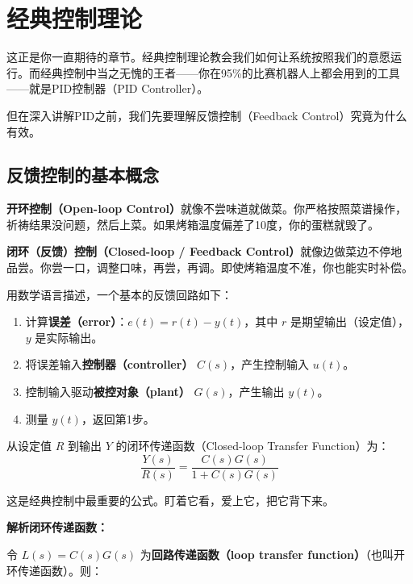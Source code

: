 \section{经典控制理论}

这正是你一直期待的章节。经典控制理论教会我们如何让系统按照我们的意愿运行。而经典控制中当之无愧的王者——你在95\%的比赛机器人上都会用到的工具——就是PID控制器（PID Controller）。

但在深入讲解PID之前，我们先要理解反馈控制（Feedback Control）究竟为什么有效。

\subsection{反馈控制的基本概念}

\textbf{开环控制（Open-loop Control）}就像不尝味道就做菜。你严格按照菜谱操作，祈祷结果没问题，然后上菜。如果烤箱温度偏差了10度，你的蛋糕就毁了。

\textbf{闭环（反馈）控制（Closed-loop / Feedback Control）}就像边做菜边不停地品尝。你尝一口，调整口味，再尝，再调。即使烤箱温度不准，你也能实时补偿。

用数学语言描述，一个基本的反馈回路如下：

\begin{enumerate}
    \item 计算\textbf{误差（error）}：$e(t) = r(t) - y(t)$，其中 $r$ 是期望输出（设定值），$y$ 是实际输出。
    \item 将误差输入\textbf{控制器（controller）} $C(s)$，产生控制输入 $u(t)$。
    \item 控制输入驱动\textbf{被控对象（plant）} $G(s)$，产生输出 $y(t)$。
    \item 测量 $y(t)$，返回第1步。
\end{enumerate}

从设定值 $R$ 到输出 $Y$ 的闭环传递函数（Closed-loop Transfer Function）为：
\begin{equation}
\frac{Y(s)}{R(s)} = \frac{C(s)G(s)}{1 + C(s)G(s)}
\end{equation}

这是经典控制中最重要的公式。盯着它看，爱上它，把它背下来。

\textbf{解析闭环传递函数：}

令 $L(s) = C(s)G(s)$ 为\textbf{回路传递函数（loop transfer function）}（也叫开环传递函数）。则：


